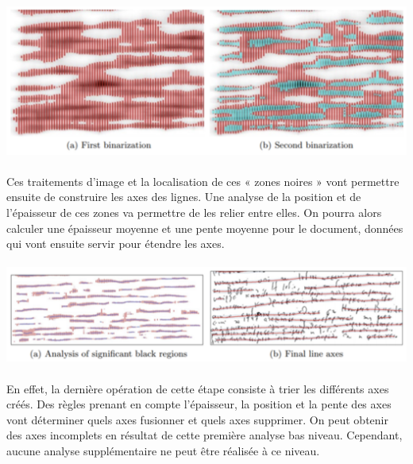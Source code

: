 \paragraph{}
\begin{mdframed}[frametitle={Figure 12 : Binarisation d'une image}, innerbottommargin=10]
\begin{center}
\includegraphics[width=0.6\linewidth]{detect2.png}
\end{center}
\end{mdframed}

\paragraph{}
Ces traitements d'image et la localisation de ces « zones noires » vont permettre ensuite de construire les axes des lignes.
Une analyse de la position et de l'épaisseur de ces zones va permettre de les relier entre elles. On pourra alors calculer
une épaisseur moyenne et une pente moyenne pour le document, données qui vont ensuite servir pour étendre les axes.

\paragraph{}
\begin{mdframed}[frametitle={Figure 13 : Extension des axes correspondant aux lignes de texte}, innerbottommargin=10]
\begin{center}
\includegraphics[width=0.6\linewidth]{detect3.png}
\end{center}
\end{mdframed}

\paragraph{}
En effet, la dernière opération de cette étape consiste à trier les différents axes créés. Des règles prenant en compte l'épaisseur,
la position et la pente des axes vont déterminer quels axes fusionner et quels axes supprimer. On peut obtenir des axes incomplets
en résultat de cette première analyse bas niveau. Cependant, aucune analyse supplémentaire ne peut être réalisée à ce niveau.

